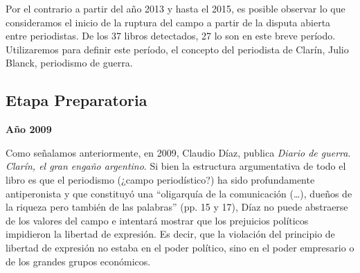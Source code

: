 Por el contrario a partir del año 2013 y hasta el 2015, es posible observar lo que consideramos el inicio de la ruptura del campo a partir de la disputa abierta entre periodistas. De los 37 libros detectados, 27 lo son en este breve período. Utilizaremos para definir este período, el concepto del periodista de Clarín, Julio Blanck, periodismo de guerra.

\subsection {Etapa Preparatoria}

\textbf{Año 2009}

Como señalamos anteriormente, en 2009, Claudio Díaz, publica \emph{Diario de guerra}. \emph{Clarín, el gran engaño argentino}. Si bien la estructura argumentativa de todo el libro es que el periodismo (¿campo periodístico?) ha sido profundamente antiperonista y que constituyó una ``oligarquía de la comunicación (\dots), dueños de la riqueza pero también de las palabras'' (pp. 15 y 17), Díaz no puede abstraerse de los valores del campo e intentará mostrar que los prejuicios políticos impidieron la libertad de expresión. Es decir, que la violación del principio de libertad de expresión no estaba en el poder político, sino en el poder empresario o de los grandes grupos económicos.

